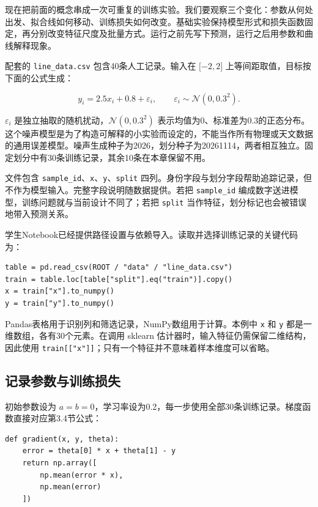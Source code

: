 现在把前面的概念串成一次可重复的训练实验。我们要观察三个变化：参数从何处出发、拟合线如何移动、训练损失如何改变。基础实验保持模型形式和损失函数固定，再分别改变特征尺度及批量方式。运行之前先写下预测，运行之后用参数和曲线解释现象。

配套的 \texttt{line\_data.csv} 包含40条人工记录。输入在 \(\lbrack - 2,2\rbrack\) 上等间距取值，目标按下面的公式生成：

\[y_{i} = 2.5x_{i} + 0.8 + \varepsilon_{i},\quad\quad\varepsilon_{i} \sim \mathcal{N}\left( 0,{0.3}^{2} \right).\]

\(\varepsilon_{i}\) 是独立抽取的随机扰动，\(\mathcal{N}\left( 0,{0.3}^{2} \right)\) 表示均值为0、标准差为0.3的正态分布。这个噪声模型是为了构造可解释的小实验而设定的，不能当作所有物理或天文数据的通用误差模型。噪声生成种子为2026，划分种子为20261114，两者相互独立。固定划分中有30条训练记录，其余10条在本章保留不用。

文件包含 \texttt{sample\_id}、\texttt{x}、\texttt{y}、\texttt{split} 四列。身份字段与划分字段帮助追踪记录，但不作为模型输入。完整字段说明随数据提供。若把 \texttt{sample\_id} 编成数字送进模型，训练问题就与当前设计不同了；若把 \texttt{split} 当作特征，划分标记也会被错误地带入预测关系。

学生Notebook已经提供路径设置与依赖导入。读取并选择训练记录的关键代码为：

\begin{verbatim}
table = pd.read_csv(ROOT / "data" / "line_data.csv")
train = table.loc[table["split"].eq("train")].copy()
x = train["x"].to_numpy()
y = train["y"].to_numpy()
\end{verbatim}

Pandas表格用于识别列和筛选记录，NumPy数组用于计算。本例中 \texttt{x} 和 \texttt{y} 都是一维数组，各有30个元素。在调用 sklearn 估计器时，输入特征仍需保留二维结构，因此使用 \texttt{train{[}{[}"x"{]}{]}}；只有一个特征并不意味着样本维度可以省略。

\subsection{记录参数与训练损失}

初始参数设为 \(a = b = 0\)，学习率设为0.2，每一步使用全部30条训练记录。梯度函数直接对应第3.4节公式：

\begin{verbatim}
def gradient(x, y, theta):
    error = theta[0] * x + theta[1] - y
    return np.array([
        np.mean(error * x),
        np.mean(error)
    ])
\end{verbatim}

